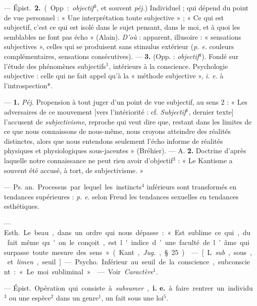 \begin{itemize}[leftmargin=1cm, label=, itemsep=1pt]
— \si{Épist.} {\bf 2.} (Opp. : {\it objectif}$^3$, et souvent {\it péj.})
Individuel ; qui dépend du point de vue personnel : « Une interprétation
toute subjective » ; « Ce qui est subjectif, c’est ce qui est isolé dans le
sujet pensant, dans le moi, et à quoi les semblables ne font pas écho
» (Alain). {\it D'où} : apparent, illusoire : « sensations subjectives »,
celles qui se produisent sans stimulus extérieur ({\it p. e.} couleurs
complémentaires, sensations consécutives). — {\bf 3.} (Opp. :
{\it objectif}$^4$). Fondé sur l'étude des phénomènes subjectifs$^1$,
intérieurs à la conscience. Psychologie subjective : celle qui ne fait appel
qu’à la « méthode subjective », {\it i. e.} à l’introspection*.

 —  {\bf 1.} {\it Péj.} Propension à tout
juger d’un point de vue subjectif, au sens 2 : « Les adversaires de ce
mouvement [vers l’intériorité : cf. {\it Subjectif}$^1$, dernier texte]
l’accusent de {\it subjectivisme}, reproche qui veut dire que, restant dans
les limites de ce que nous connaissons de nous-même, nous croyons atteindre
des réalités distinctes, alors que nous entendons seulement l’écho informe de
réalités physiques et physiologiques sous-jacentes » (Bréhier). — A. {\bf 2.}
Doctrine d’après laquelle notre connaissance ne peut rien avoir
d’objectif$^3$ : « Le Kantisme a souvent été accusé, à tort, de
subjectivisme. »

 — \si{Ps. an.} Processus par lequel les instincts$^4$
inférieurs sont transformés en tendances supérieures : {\it p. e.} selon
Freud les tendances sexuelles en tendances esthétiques.

 — \si{Esth.} Le beau, dans un ordre qui nous dépasse : « Est
sublime ce qui, du fait même qu'on le conçoit, est l'indice d’une faculté de
l’âme qui surpasse toute mesure des sens » (Kant, {\it Jug.}, § 25).

 — [L. {\it sub}, sous, et {\it limen}, seuil]. — \si{Psycho.}
Inférieur au seuil de la conscience, subconscient : « Le moi subliminal. »

 — Voir {\it Caractère}$^1$.

 — \si{Épist.} Opération qui consiste à {\it subsumer},
{\bf i. e.} à faire rentrer un individu$^3$ ou une espèce$^2$ dans un
genre$^1$, un fait sous une loi$^5$.


\end{itemize}
